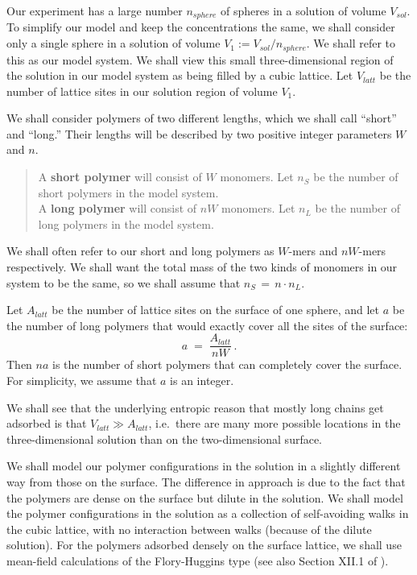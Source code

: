 \documentclass[journal=jacsat,manuscript=article]{achemso}
\begin{document}
Our experiment has a large number $n_{sphere}$ of spheres in a solution of volume $V_{sol}$.  To simplify 
our model and keep the concentrations the same, we shall consider only a single sphere in a solution
of volume $V_1:=V_{sol}/n_{sphere}$.  We shall refer to this as our model system.
We shall view this small three-dimensional region of the solution in our model system as being filled by a 
cubic lattice.
Let $V_{latt}$ be the number of lattice sites in our solution region of volume $V_1$. 

We shall consider polymers of two different lengths, which we shall call ``short'' and ``long.''  Their lengths
will be described by two positive integer parameters $W$ and $n$.

\begin{verse}
A \textbf{short polymer} will consist of $W$ monomers.  
Let $n_S$ be the number of short polymers in the model system. 
\\
A \textbf{long polymer} will consist of $nW$ monomers.  
Let $n_L$ be the number of long polymers in the model system. 
\end{verse}
We shall often refer to our short and long polymers as $W$-mers and $nW$-mers respectively.
We shall want the total mass of the two kinds of monomers in our system to be the same, so we 
shall assume that $n_S \,=\, n\cdot n_L$.

Let $A_{latt}$ be the number of lattice sites on the surface of one sphere, and let $a$
be the number of long polymers that would exactly cover all the sites of the surface:
\[    a  \;=\;  \frac{A_{latt}}{nW}   \,  .  \]
Then $na$ is the number of short polymers that can completely cover the surface.
For simplicity, we assume that $a$ is an integer.

We shall see that the underlying entropic reason that
mostly long chains get adsorbed is that $V_{latt}\gg A_{latt}$, i.e.\ there are many more possible locations in 
the three-dimensional solution than on the two-dimensional surface.


We shall model our polymer configurations in the solution in a slightly different way from those on the surface.
The difference in approach is due to the fact that the polymers are dense on the surface but 
dilute in the solution.  We shall model the polymer configurations in the solution as a collection of 
self-avoiding walks in the cubic lattice, with no interaction between walks (because of the dilute solution).
For the polymers adsorbed densely on the surface lattice, we shall use mean-field calculations 
of the Flory-Huggins type 
(see also Section XII.1 of \cite{Flo}).
\end{document}
